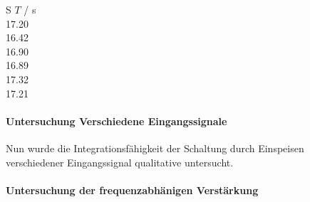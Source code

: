 \documentclass[12pt,english,ngerman]{scrartcl}
\begin{document}
\begin{table}
  \caption{Messungen der Integrationszeit der realen Schaltung aus
  \autoref{fig:sim_integrator_schaltung}, wobei $T$ die Ladezeit bis am Ausgang
  \SI{10}{\volt} anliegt. Bei einem Ladespannung \SI{91.8}{\milli\volt}, einem
  Widerstand von \SI{21.9}{\kilo\ohm} und einer Kapazität von
  \SI{6.8}{\micro\farad} }
  \label{tab:messungen_integration}
  \centering
  \begin{tabular}[c]{S}
    {$T$ / \si{\second}} \\
    17.20 \\
    16.42 \\
    16.90 \\
    16.89 \\
    17.32 \\
    17.21 \\
  \end{tabular}
\end{table}



\paragraph{Untersuchung Verschiedene Eingangssignale}
Nun wurde die Integrationsfähigkeit der Schaltung durch Einspeisen
verschiedener Eingangssignal qualitative untersucht.

\begin{figure}[H]
  \centering
  \caption{}
  \label{fig:mess_integrator_sinussignal}
\end{figure}

\begin{figure}[H]
  \centering
  \caption{}
  \label{fig:mess_integrator_dreiecksignal}
\end{figure}


\paragraph{Untersuchung der frequenzabhänigen Verstärkung}
\end{document}
